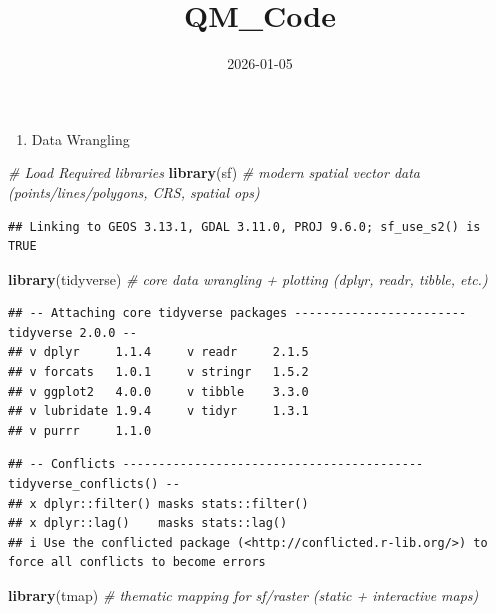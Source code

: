 \documentclass[
]{article}
\title{QM\_Code}
\author{}
\date{\vspace{-2.5em}2026-01-05}
\newenvironment{Shaded}{\begin{snugshade}}{\end{snugshade}}
\newcommand{\CommentTok}[1]{\textcolor[rgb]{0.56,0.35,0.01}{\textit{#1}}}
\newcommand{\FunctionTok}[1]{\textcolor[rgb]{0.13,0.29,0.53}{\textbf{#1}}}
\newcommand{\NormalTok}[1]{#1}
\providecommand{\tightlist}{%
  \setlength{\itemsep}{0pt}\setlength{\parskip}{0pt}}
\begin{document}
\maketitle

\begin{enumerate}
\def\labelenumi{\arabic{enumi}.}
\tightlist
\item
  Data Wrangling
\end{enumerate}

\begin{Shaded}
\begin{Highlighting}[]
\CommentTok{\# Load Required libraries}
\FunctionTok{library}\NormalTok{(sf)              }\CommentTok{\# modern spatial vector data (points/lines/polygons, CRS, spatial ops)}
\end{Highlighting}
\end{Shaded}

\begin{verbatim}
## Linking to GEOS 3.13.1, GDAL 3.11.0, PROJ 9.6.0; sf_use_s2() is TRUE
\end{verbatim}

\begin{Shaded}
\begin{Highlighting}[]
\FunctionTok{library}\NormalTok{(tidyverse)       }\CommentTok{\# core data wrangling + plotting (dplyr, readr, tibble, etc.)}
\end{Highlighting}
\end{Shaded}

\begin{verbatim}
## -- Attaching core tidyverse packages ------------------------ tidyverse 2.0.0 --
## v dplyr     1.1.4     v readr     2.1.5
## v forcats   1.0.1     v stringr   1.5.2
## v ggplot2   4.0.0     v tibble    3.3.0
## v lubridate 1.9.4     v tidyr     1.3.1
## v purrr     1.1.0
\end{verbatim}

\begin{verbatim}
## -- Conflicts ------------------------------------------ tidyverse_conflicts() --
## x dplyr::filter() masks stats::filter()
## x dplyr::lag()    masks stats::lag()
## i Use the conflicted package (<http://conflicted.r-lib.org/>) to force all conflicts to become errors
\end{verbatim}

\begin{Shaded}
\begin{Highlighting}[]
\FunctionTok{library}\NormalTok{(tmap)            }\CommentTok{\# thematic mapping for sf/raster (static + interactive maps)}
\end{Highlighting}
\end{Shaded}
\end{document}
